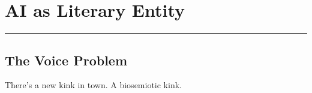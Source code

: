\chapter{AI as Literary Entity}
\label{ch:cott-literary-entity}

%

\begin{center}\rule{0.5\linewidth}{0.5pt}\end{center}

\hypertarget{the-voice-problem}{%
\section{The Voice Problem}\label{the-voice-problem}}

There's a new kink in town.
A biosemiotic kink.

